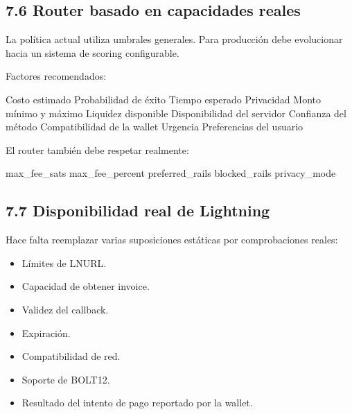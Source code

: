 \documentclass[
]{article}
\newenvironment{Shaded}{}{}
\newcommand{\NormalTok}[1]{#1}
\providecommand{\tightlist}{%
  \setlength{\itemsep}{0pt}\setlength{\parskip}{0pt}}
\begin{document}
\hypertarget{router-basado-en-capacidades-reales}{%
\subsection{7.6 Router basado en capacidades
reales}\label{router-basado-en-capacidades-reales}}

La política actual utiliza umbrales generales. Para producción debe
evolucionar hacia un sistema de scoring configurable.

Factores recomendados:

\begin{Shaded}
\begin{Highlighting}[]
\NormalTok{Costo estimado}
\NormalTok{Probabilidad de éxito}
\NormalTok{Tiempo esperado}
\NormalTok{Privacidad}
\NormalTok{Monto mínimo y máximo}
\NormalTok{Liquidez disponible}
\NormalTok{Disponibilidad del servidor}
\NormalTok{Confianza del método}
\NormalTok{Compatibilidad de la wallet}
\NormalTok{Urgencia}
\NormalTok{Preferencias del usuario}
\end{Highlighting}
\end{Shaded}

El router también debe respetar realmente:

\begin{Shaded}
\begin{Highlighting}[]
\NormalTok{max\_fee\_sats}
\NormalTok{max\_fee\_percent}
\NormalTok{preferred\_rails}
\NormalTok{blocked\_rails}
\NormalTok{privacy\_mode}
\end{Highlighting}
\end{Shaded}

\hypertarget{disponibilidad-real-de-lightning}{%
\subsection{7.7 Disponibilidad real de
Lightning}\label{disponibilidad-real-de-lightning}}

Hace falta reemplazar varias suposiciones estáticas por comprobaciones
reales:

\begin{itemize}
\tightlist
\item
  Límites de LNURL.
\item
  Capacidad de obtener invoice.
\item
  Validez del callback.
\item
  Expiración.
\item
  Compatibilidad de red.
\item
  Soporte de BOLT12.
\item
  Resultado del intento de pago reportado por la wallet.
\end{itemize}
\end{document}
